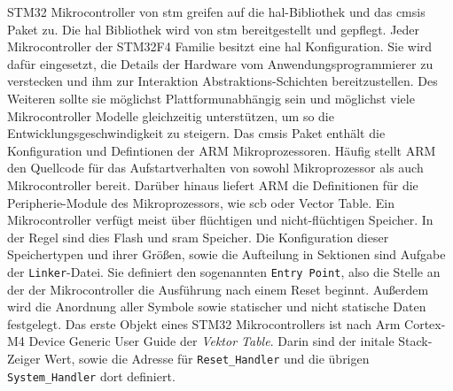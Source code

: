 STM32 Mikrocontroller von \ac{stm} greifen auf die \ac{hal}-Bibliothek und das
\ac{cmsis} Paket zu.
Die \ac{hal} Bibliothek wird von \ac{stm} bereitgestellt und gepflegt.
Jeder Mikrocontroller der STM32F4 Familie besitzt eine \ac{hal} Konfiguration.
Sie wird dafür eingesetzt, die Details der Hardware vom Anwendungsprogrammierer
zu verstecken und ihm zur Interaktion Abstraktions-Schichten
bereitzustellen\cite{Stm32F4HalMan}.
Des Weiteren sollte sie möglichst Plattformunabhängig sein und möglichst viele
Mikrocontroller Modelle gleichzeitig unterstützen, um so die
Entwicklungsgeschwindigkeit zu steigern.
Das \ac{cmsis} Paket enthält die Konfiguration und Defintionen der ARM
Mikroprozessoren.
Häufig stellt ARM den Quellcode für das Aufstartverhalten von sowohl
Mikroprozessor als auch Mikrocontroller bereit.
Darüber hinaus liefert ARM die Definitionen für die Peripherie-Module des
Mikroprozessors, wie \ac{scb} oder Vector Table\cite{ArmCortexM4Dgug}.
\newline
Ein Mikrocontroller verfügt meist über flüchtigen und nicht-flüchtigen
Speicher.
In der Regel sind dies Flash und \ac{sram} Speicher.
Die Konfiguration dieser Speichertypen und ihrer Größen, sowie die Aufteilung
in Sektionen sind Aufgabe der \texttt{Linker}-Datei. 
Sie definiert den sogenannten \texttt{Entry Point}, also die Stelle an der der
Mikrocontroller die Ausführung nach einem Reset beginnt.
Außerdem wird die Anordnung aller Symbole sowie statischer und nicht statische
Daten festgelegt.
Das erste Objekt eines STM32 Mikrocontrollers ist nach Arm Cortex-M4 Device
Generic User Guide der \textit{Vektor Table}.\cite{ArmCortexM4Dgug}
Darin sind der initale Stack-Zeiger Wert, sowie die Adresse für
\texttt{Reset\_Handler} und die übrigen \texttt{System\_Handler} dort
definiert.


